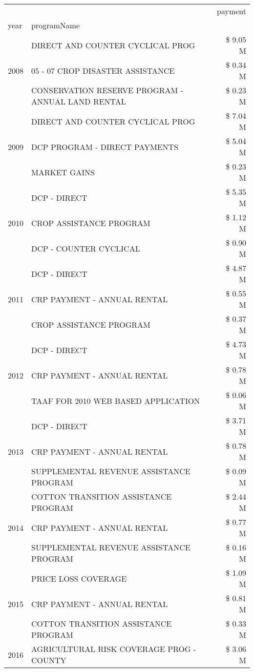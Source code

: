 \begin{tabular}{llr}
\toprule
 &  & payment \\
year & programName &  \\
\midrule
\multirow[t]{3}{*}{2008} & DIRECT AND COUNTER CYCLICAL PROG & \$ 9.05 M \\
 & 05 - 07 CROP DISASTER ASSISTANCE & \$ 0.34 M \\
 & CONSERVATION RESERVE PROGRAM - ANNUAL LAND RENTAL & \$ 0.23 M \\
\cline{1-3}
\multirow[t]{3}{*}{2009} & DIRECT AND COUNTER CYCLICAL PROG & \$ 7.04 M \\
 & DCP PROGRAM - DIRECT PAYMENTS & \$ 5.04 M \\
 & MARKET GAINS & \$ 0.23 M \\
\cline{1-3}
\multirow[t]{3}{*}{2010} & DCP - DIRECT & \$ 5.35 M \\
 & CROP ASSISTANCE PROGRAM & \$ 1.12 M \\
 & DCP - COUNTER CYCLICAL & \$ 0.90 M \\
\cline{1-3}
\multirow[t]{3}{*}{2011} & DCP - DIRECT & \$ 4.87 M \\
 & CRP PAYMENT - ANNUAL RENTAL & \$ 0.55 M \\
 & CROP ASSISTANCE PROGRAM & \$ 0.37 M \\
\cline{1-3}
\multirow[t]{3}{*}{2012} & DCP - DIRECT & \$ 4.73 M \\
 & CRP PAYMENT - ANNUAL RENTAL & \$ 0.78 M \\
 & TAAF FOR 2010 WEB BASED APPLICATION & \$ 0.06 M \\
\cline{1-3}
\multirow[t]{3}{*}{2013} & DCP - DIRECT & \$ 3.71 M \\
 & CRP PAYMENT - ANNUAL RENTAL & \$ 0.78 M \\
 & SUPPLEMENTAL REVENUE ASSISTANCE PROGRAM & \$ 0.09 M \\
\cline{1-3}
\multirow[t]{3}{*}{2014} & COTTON TRANSITION ASSISTANCE PROGRAM & \$ 2.44 M \\
 & CRP PAYMENT - ANNUAL RENTAL & \$ 0.77 M \\
 & SUPPLEMENTAL REVENUE ASSISTANCE PROGRAM & \$ 0.16 M \\
\cline{1-3}
\multirow[t]{3}{*}{2015} & PRICE LOSS COVERAGE & \$ 1.09 M \\
 & CRP PAYMENT - ANNUAL RENTAL & \$ 0.81 M \\
 & COTTON TRANSITION ASSISTANCE PROGRAM & \$ 0.33 M \\
\cline{1-3}
\multirow[t]{3}{*}{2016} & AGRICULTURAL RISK COVERAGE PROG - COUNTY & \$ 3.06 M \\

\end{tabular}
